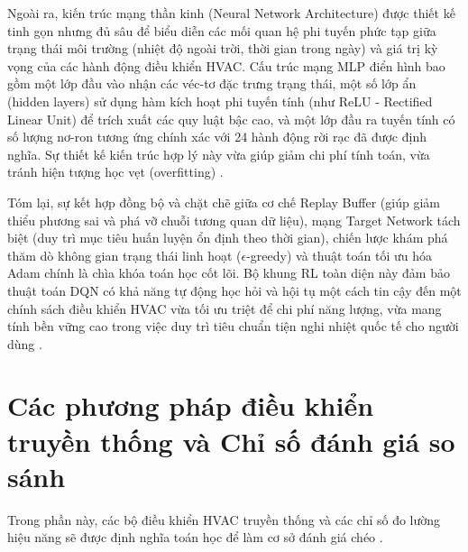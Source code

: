 \documentclass[12pt, a4paper]{report}
\begin{document}
Ngoài ra, kiến trúc mạng thần kinh (Neural Network Architecture) được thiết kế tinh gọn nhưng đủ sâu để biểu diễn các mối quan hệ phi tuyến phức tạp giữa trạng thái môi trường (nhiệt độ ngoài trời, thời gian trong ngày) và giá trị kỳ vọng của các hành động điều khiển HVAC. Cấu trúc mạng MLP điển hình bao gồm một lớp đầu vào nhận các véc-tơ đặc trưng trạng thái, một số lớp ẩn (hidden layers) sử dụng hàm kích hoạt phi tuyến tính (như ReLU - Rectified Linear Unit) để trích xuất các quy luật bậc cao, và một lớp đầu ra tuyến tính có số lượng nơ-ron tương ứng chính xác với 24 hành động rời rạc đã được định nghĩa. Sự thiết kế kiến trúc hợp lý này vừa giúp giảm chi phí tính toán, vừa tránh hiện tượng học vẹt (overfitting) \cite{dqn}.

Tóm lại, sự kết hợp đồng bộ và chặt chẽ giữa cơ chế Replay Buffer (giúp giảm thiểu phương sai và phá vỡ chuỗi tương quan dữ liệu), mạng Target Network tách biệt (duy trì mục tiêu huấn luyện ổn định theo thời gian), chiến lược khám phá thăm dò không gian trạng thái linh hoạt ($\epsilon$-greedy) và thuật toán tối ưu hóa Adam chính là chìa khóa toán học cốt lõi. Bộ khung RL toàn diện này đảm bảo thuật toán DQN có khả năng tự động học hỏi và hội tụ một cách tin cậy đến một chính sách điều khiển HVAC vừa tối ưu triệt để chi phí năng lượng, vừa mang tính bền vững cao trong việc duy trì tiêu chuẩn tiện nghi nhiệt quốc tế cho người dùng \cite{dqn,adam,ashrae55}.

\section{Các phương pháp điều khiển truyền thống và Chỉ số đánh giá so sánh}
Trong phần này, các bộ điều khiển HVAC truyền thống và các chỉ số đo lường hiệu năng sẽ được định nghĩa toán học để làm cơ sở đánh giá chéo \cite{whulx,ashrae55}.
\end{document}
